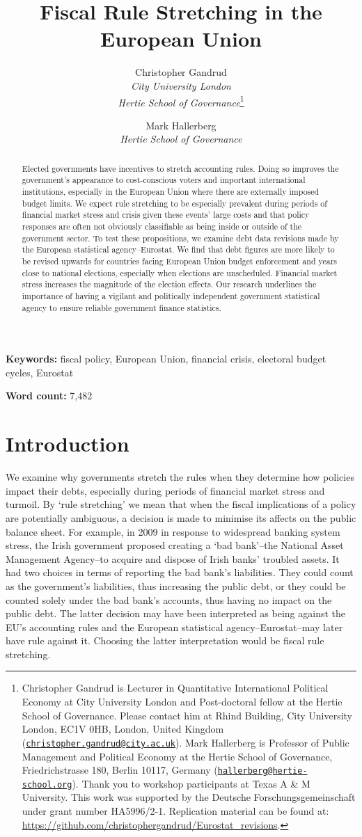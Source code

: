 \documentclass[]{article}
\title{Fiscal Rule Stretching in the European Union}
\author{Christopher Gandrud \\ \emph{City University London} \\ \emph{Hertie School of Governance}\footnote{Christopher Gandrud is Lecturer in Quantitative International Political Economy at City University London and Post-doctoral fellow at the Hertie School of Governance. Please contact him at Rhind Building, City University London, EC1V 0HB, London, United Kingdom
(\href{mailto:christopher.gandrud@city.ac.uk}{\nolinkurl{christopher.gandrud@city.ac.uk}}). Mark Hallerberg is Professor of Public Management and Political Economy at the Hertie School of Governance, Friedrichstrasse 180, Berlin 10117, Germany (\href{mailto:hallerberg@hertie-school.org}{\nolinkurl{hallerberg@hertie-school.org}}). Thank you to workshop participants at Texas A \& M University. This work was supported by the Deutsche Forschungsgemeinschaft under grant number HA5996/2-1. Replication material can be found at: \url{https://github.com/christophergandrud/Eurostat_revisions}.}
\and
Mark Hallerberg \\ \emph{Hertie School of Governance}}
\begin{document}
\maketitle


\begin{abstract}
Elected governments have incentives to stretch accounting rules. Doing so improves the government’s appearance to cost-conscious voters and important international institutions, especially in the European Union where there are externally imposed budget limits. We expect rule stretching to be especially prevalent during periods of financial market stress and crisis given these events' large costs and that policy responses are often not obviously classifiable as being inside or outside of the government sector. To test these propositions, we examine debt data revisions made by the European statistical agency--Eurostat. We find that debt figures are more likely to be revised upwards for countries facing European Union budget enforcement and years close to national elections, especially when elections are unscheduled. Financial market stress increases the magnitude of the election effects. Our research underlines the importance of having a vigilant and politically independent government statistical agency to ensure reliable government finance statistics.
\end{abstract}


\textbf{Keywords:} fiscal policy, European Union, financial crisis, electoral budget cycles, Eurostat

\textbf{Word count:} 7,482

\pagebreak

\section{Introduction}

We examine why governments stretch the rules when they determine how policies impact their debts, especially during periods of financial market stress and turmoil. By `rule stretching' we mean that when the fiscal implications of a policy are potentially ambiguous, a decision is made to minimise its affects on the public balance sheet. For example, in 2009 in response to widespread banking system stress, the Irish government proposed creating a `bad bank'--the National Asset Management Agency--to acquire and dispose of Irish banks' troubled assets. It had two choices in terms of reporting the bad bank's liabilities. They could count as the government's liabilities, thus increasing the public debt, or they could be counted solely under the bad bank's accounts, thus having no impact on the public debt. The latter decision may have been interpreted as being against the EU's accounting rules and the European statistical agency--Eurostat--may later have rule against it. Choosing the latter interpretation would be fiscal rule stretching.
\end{document}
